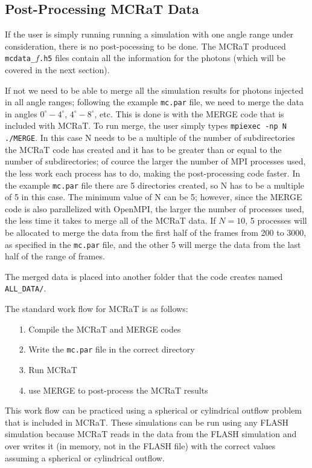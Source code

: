 \documentclass[12pt,a4paper]{article}
\begin{document}
 \subsection{Post-Processing MCRaT Data}
 If the user is simply running running a simulation with one angle range under consideration, there is no post-pocessing to be done. The MCRaT produced \texttt{mcdata\_$f$.h5} files contain all the information for the photons (which will be covered in the next section).
 
 If not we need to be able to merge all the simulation results for photons injected in all angle ranges; following the example \texttt{mc.par} file, we need to merge the data in angles $0^\circ-4^\circ$, $4^\circ-8^\circ$, etc. This is done is with the MERGE code that is included with MCRaT. To run merge, the user simply types \texttt{mpiexec -np N ./MERGE}. In this case N needs to be a multiple of the number of subdirectories the MCRaT code has created and it has to be greater than or equal to the number of subdirectories; of cource the larger the number of MPI processes used, the less work each process has to do, making the post-processing code faster. In the example \texttt{mc.par} file there are 5 directories created, so N has to be a multiple of 5 in this case. The minimum value of N can be 5; however, since the MERGE code is also parallelized with OpenMPI, the larger the number of processes used, the less time it takes to merge all of the MCRaT data.  If $N=10$, 5 processes will be allocated to merge the data from the first half of the frames from 200 to 3000, as specified in the \texttt{mc.par} file, and the other 5 will merge the data from the last half of the range of frames.
 
 The merged data is placed into another folder that the code creates named \texttt{ALL\_DATA/}. \newline
 
 \noindent The standard work flow for MCRaT is as follows:
 \begin{itemize}
 \item[1.] Compile the MCRaT and MERGE codes
 \item[2.] Write the \texttt{mc.par} file in the correct directory
 \item[3.] Run MCRaT
 \item[4.] use MERGE to post-process the MCRaT results
 \end{itemize}
 
 This work flow can be practiced using a spherical or cylindrical outflow problem that is included in MCRaT. These simulations can be run using any FLASH simulation because MCRaT reads in the data from the FLASH simulation and over writes it (in memory, not in the FLASH file) with the correct values assuming a spherical or cylindrical outflow.
 
\end{document}
